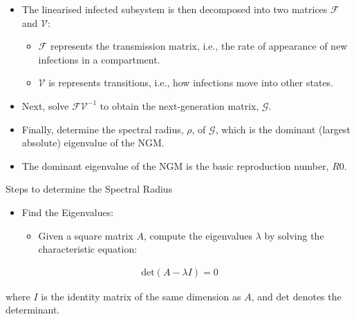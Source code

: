 \documentclass[
  ignorenonframetext,
]{beamer}
\providecommand{\tightlist}{%
  \setlength{\itemsep}{0pt}\setlength{\parskip}{0pt}}\usepackage{longtable,booktabs,array}
\begin{document}
\begin{frame}
\begin{itemize}
\item
  The linearised infected subsystem is then decomposed into two matrices
  \(\mathcal{F}\) and \(\mathcal{V}\):

  \begin{itemize}
  \tightlist
  \item
    \(\mathcal{F}\) represents the transmission matrix, i.e., the rate
    of appearance of new infections in a compartment.
  \item
    \(\mathcal{V}\) is represents transitions, i.e., how infections move
    into other states.
  \end{itemize}
\end{itemize}
\end{frame}

\begin{frame}
\begin{itemize}
\item
  Next, solve \(\mathcal{F}\mathcal{V}^{-1}\) to obtain the
  next-generation matrix, \(\mathcal{G}\).
\item
  Finally, determine the spectral radius, \(\rho\), of \(\mathcal{G}\),
  which is the {dominant (largest absolute) eigenvalue} of the NGM.
\item
  The dominant eigenvalue of the NGM is the basic reproduction number,
  \(R0\).
\end{itemize}
\end{frame}

\begin{frame}
\begin{block}{Steps to determine the Spectral Radius}
\label{steps-to-determine-the-spectral-radius}
\begin{itemize}
\tightlist
\item
  Find the Eigenvalues:

  \begin{itemize}
  \tightlist
  \item
    Given a square matrix \(A\), compute the eigenvalues \(\lambda\) by
    solving the characteristic equation:
  \end{itemize}
\end{itemize}

\begin{equation*}
\begin{aligned}
\text{det}(A - \lambda I) = 0
\end{aligned}
\end{equation*}

where \(I\) is the identity matrix of the same dimension as \(A\), and
\(\text{det}\) denotes the determinant.
\end{block}
\end{frame}
\end{document}
